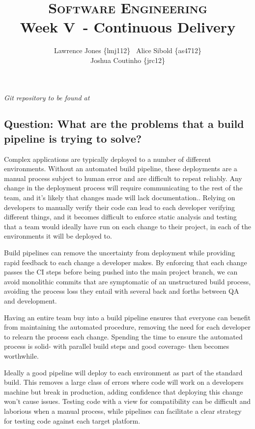 \documentclass[11pt]{article}
\title{\textsc{Software Engineering}\\Week V~- Continuous Delivery}
\author{Lawrence Jones \{lmj112\} \  Alice Sibold \{as4712\} \\
        Joshua Coutinho \{jrc12\}}
\date{}
\begin{document}
\maketitle


\textit{Git repository to be found at
 }

\subsection*{Question: What are the problems that a build pipeline is trying to
solve?}

Complex applications are typically deployed to a number of different
environments. Without an automated build pipeline, these deployments are a
manual process subject to human error and are difficult to repeat reliably. Any
change in the deployment process will require communicating to the rest of the
team, and it's likely that changes made will lack documentation.\cite{bsdp}.
Relying on developers to manually verify their code can lead to each developer
verifying different things, and it becomes difficult to enforce static analysis
and testing that a team would ideally have run on each change to their project,
in each of the environments it will be deployed to.\cite{methodsntools}

Build pipelines can remove the uncertainty from deployment while providing rapid
feedback to each change a developer makes. By enforcing that each change passes
the CI steps before being pushed into the main project branch, we can avoid
monolithic commits that are symptomatic of an unstructured build process,
avoiding the process loss they entail with several back and forths between QA
and development\cite{cimartinfowler}.

Having an entire team buy into a build pipeline ensures that everyone can
benefit from maintaining the automated procedure, removing the need for each
developer to relearn the process each change. Spending the time to ensure the
automated process is solid- with parallel build steps and good coverage- then
becomes worthwhile.

Ideally a good pipeline will deploy to each environment as part of the standard
build. This removes a large class of errors where code will work on a developers
machine but break in production, adding confidence that deploying this change
won't cause issues. Testing code with a view for compatibility can be difficult
and laborious when a manual process, while pipelines can facilitate a clear
strategy for testing code against each target platform.
\end{document}
